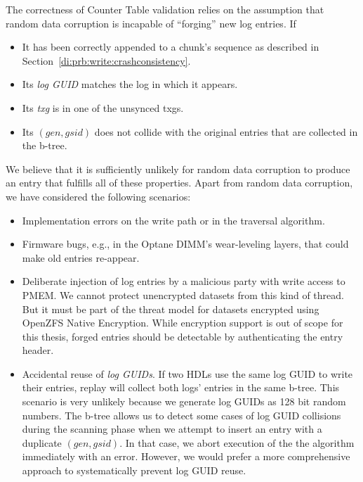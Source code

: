 \documentclass[12pt,a4paper,twoside]{book}
\begin{document}
The correctness of Counter Table validation relies on the assumption that random data corruption is incapable of ``forging'' new log entries.
If 
\begin{itemize}[noitemsep]
    \item It has been correctly appended to a chunk's sequence as described in Section~\ref{di:prb:write:crashconsistency}.
    \item Its \textit{log GUID} matches the log in which it appears.
    \item Its \textit{txg} is in one of the unsynced txgs.
    \item Its $(gen, gsid)$ does not collide with the original entries that are collected in the b-tree.
\end{itemize}
We believe that it is sufficiently unlikely for random data corruption to produce an entry that fulfills all of these properties.
Apart from random data corruption, we have considered the following scenarios:
\begin{itemize}[noitemsep]
\item Implementation errors on the write path or in the traversal algorithm.
\item Firmware bugs, e.g., in the Optane DIMM's wear-leveling layers, that could make old entries re-appear.
\item Deliberate injection of log entries by a malicious party with write access to PMEM.
    We cannot protect unencrypted datasets from this kind of thread.
    But it must be part of the threat model for datasets encrypted using OpenZFS Native Encryption.
    While encryption support is out of scope for this thesis, forged entries should be detectable by authenticating the entry header.
\item Accidental reuse of \textit{log GUIDs}.
    If two HDLs use the same log GUID to write their entries, replay will collect both logs' entries in the same b-tree.
    This scenario is very unlikely because we generate log GUIDs as 128 bit random numbers.
    The b-tree allows us to detect some cases of log GUID collisions during the scanning phase when we attempt to insert an entry with a duplicate $(gen, gsid)$.
    In that case, we abort execution of the the algorithm immediately with an error.
    However, we would prefer a more comprehensive approach to systematically prevent log GUID reuse.
\end{itemize}
\end{document}
